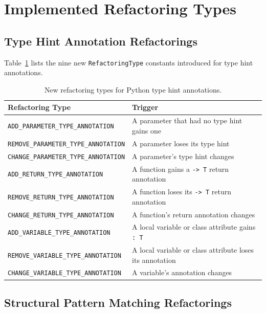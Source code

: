 \documentclass[11pt,a4paper]{article}
\newcommand{\code}[1]{\texttt{#1}}
\begin{document}
\section{Implemented Refactoring Types}

\subsection{Type Hint Annotation Refactorings}

Table~\ref{tab:annotation-types} lists the nine new \code{RefactoringType} constants introduced for type hint annotations.

\begin{table}[ht]
  \centering
  \caption{New refactoring types for Python type hint annotations.}
  \label{tab:annotation-types}
  \small
  \begin{tabular}{@{}ll@{}}
    \toprule
    \textbf{Refactoring Type} & \textbf{Trigger} \\
    \midrule
    \code{ADD\_PARAMETER\_TYPE\_ANNOTATION}    & A parameter that had no type hint gains one \\
    \code{REMOVE\_PARAMETER\_TYPE\_ANNOTATION} & A parameter loses its type hint \\
    \code{CHANGE\_PARAMETER\_TYPE\_ANNOTATION} & A parameter's type hint changes \\
    \code{ADD\_RETURN\_TYPE\_ANNOTATION}        & A function gains a \code{-> T} return annotation \\
    \code{REMOVE\_RETURN\_TYPE\_ANNOTATION}     & A function loses its \code{-> T} return annotation \\
    \code{CHANGE\_RETURN\_TYPE\_ANNOTATION}     & A function's return annotation changes \\
    \code{ADD\_VARIABLE\_TYPE\_ANNOTATION}      & A local variable or class attribute gains \code{: T} \\
    \code{REMOVE\_VARIABLE\_TYPE\_ANNOTATION}   & A local variable or class attribute loses its annotation \\
    \code{CHANGE\_VARIABLE\_TYPE\_ANNOTATION}   & A variable's annotation changes \\
    \bottomrule
  \end{tabular}
\end{table}

\subsection{Structural Pattern Matching Refactorings}
\end{document}
